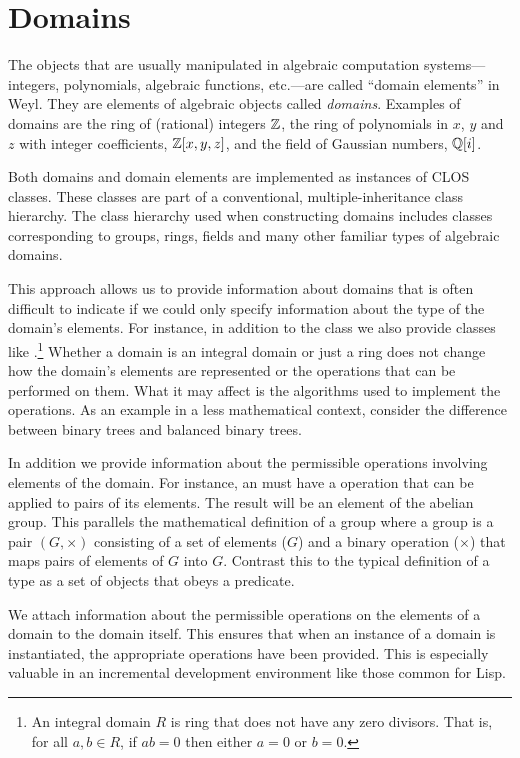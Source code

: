 \section{Domains}
\label{Domains:Sec}

The objects that are usually manipulated in algebraic computation
systems---integers, polynomials, algebraic functions, etc.---are
called ``domain elements'' in Weyl.  They are elements of algebraic
objects called {\em domains\/}.  Examples of domains are the ring of
(rational) integers ${\Bbb Z}$, the ring of polynomials in $x$, $y$ and $z$
with integer coefficients, ${\Bbb Z}[x, y, z]$, and the field of Gaussian
numbers, ${\Bbb Q}[i]$.

Both domains and domain elements are implemented as instances of CLOS
classes.  These classes are part of a conventional,
multiple-inheritance class hierarchy.  The class hierarchy used when
constructing domains includes classes corresponding to groups, rings,
fields and many other familiar types of algebraic domains.

This approach allows us to provide information about domains that is
often difficult to indicate if we could only specify information about
the type of the domain's elements.  For instance, in addition to the
class  we also provide classes like
.\footnote{An integral domain $R$ is ring
that does not have any zero divisors.  That is, for all $a, b \in R$,
if $ab = 0$ then either $a=0$ or $b=0$.} Whether a domain is an
integral domain or just a ring does not change how the domain's
elements are represented or the operations that can be performed on
them.  What it may affect is the algorithms used to implement the
operations.  As an example in a less mathematical context, consider
the difference between binary trees and balanced binary trees. 

In addition we provide information about the permissible operations
involving elements of the domain.  For instance, an
 must have a  operation that can be
applied to pairs of its elements.  The result will be an element of
the abelian group.  This parallels the mathematical definition of a
group where a group is a pair $(G, \times)$ consisting of a set of
elements ($G$) and a binary operation ($\times$) that maps pairs of
elements of $G$ into $G$.  Contrast this to the typical definition of
a type as a set of objects that obeys a predicate.

We attach information about the permissible operations on the elements
of a domain to the domain itself.  This ensures that when an instance
of a domain is instantiated, the appropriate operations have been
provided.  This is especially valuable in an incremental development
environment like those common for Lisp.

